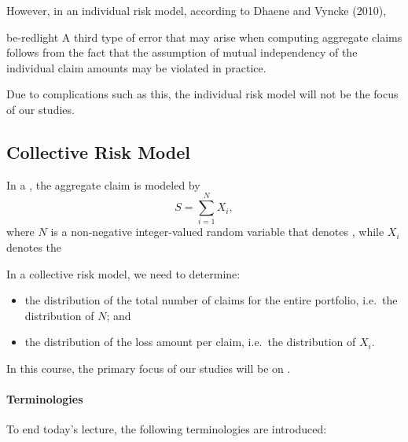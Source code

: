 \documentclass[notoc,notitlepage]{tufte-book}
\begin{document}
However, in an individual risk model, according to Dhaene and Vyncke (2010)\cite{DhaeneVyncke2010},

\begin{quotebox}{be-red}{light}
  A third type of error that may arise when computing aggregate claims follows from the fact that the assumption of mutual independency of the individual claim amounts may be violated in practice.
\end{quotebox}

Due to complications such as this, the individual risk model will not be the focus of our studies.


\subsection{Collective Risk Model}%
\label{sub:collective_risk_model}

\begin{defn}\label{defn:collective_risk_model}
  In a , the aggregate claim is modeled by
  \begin{equation*}
    S = \sum_{i=1}^{N} X_i, \end{equation*}
  where $N$ is a non-negative integer-valued random variable that denotes , while $X_i$ denotes the 
\end{defn}

\begin{note}
  In a collective risk model, we need to determine:
  \begin{itemize}
    \item the distribution of the total number of claims for the entire portfolio, i.e.\ the distribution of $N$; and
    \item the distribution of the loss amount per claim, i.e.\ the distribution of $X_i$.
  \end{itemize}
\end{note}


In this course, the primary focus of our studies will be on .

\paragraph{Terminologies} To end today's lecture, the following terminologies are introduced:
\end{document}
